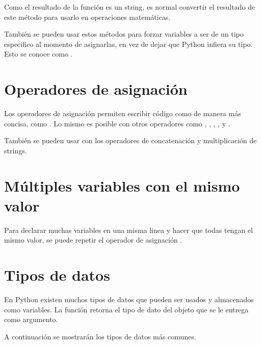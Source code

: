 Como el resultado de la función  es un string, es normal convertir el resultado de este método para usarlo en operaciones matemáticas.


También se pueden usar estos métodos para forzar variables a ser de un tipo específico al momento de asignarlas, en vez de dejar que Python infiera su tipo.
Esto se conoce como .


\section{Operadores de asignación}

Los operadores de asignación permiten escribir código como  de manera más concisa, como .
Lo mismo es posible con otros operadores como \ttt{-}, \ttt{*}, \ttt{/}, \ttt{//}, \ttt{\%} y \ttt{**}.


También se pueden usar con los operadores de concatenación y multiplicación de strings.


\section{Múltiples variables con el mismo valor}

Para declarar muchas variables en una misma linea y hacer que todas tengan el mismo valor, se puede repetir el operador de asignación \ttt{=}.


\section{Tipos de datos}

En Python existen muchos tipos de datos que pueden ser usados y almacenados como variables.
La función  retorna el tipo de dato del objeto que se le entrega como argumento.
\medskip

A continuación se mostrarán los tipos de datos más comunes.

